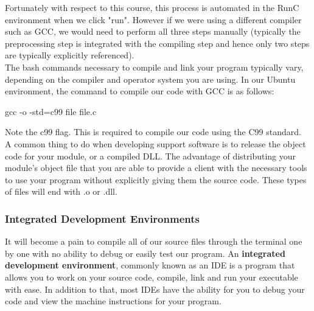 Fortunately with respect to this course, this process is automated in the RunC environment when we click "run". However if we were using a different compiler such as GCC, we would need to perform all three steps manually (typically the preprocessing step is integrated with the compiling step and hence only two steps are typically explicitly referenced).\\

The bash commands necessary to compile and link your program typically vary, depending on the compiler and operator system you are using. In our Ubuntu environment, the command to compile our code with GCC is as follows:\\

\begin{code}[bash]
gcc -o -std=c99 file file.c
\end{code}

Note the c99 flag. This is required to compile our code using the C99 standard.\\

A common thing to do when developing support software is to release the object code for your module, or a compiled DLL. The advantage of distributing your module's object file that you are able to provide a client with the necessary tools to use your program without explicitly giving them the source code. These types of files will end with .o or .dll.\\


\subsubsection*{Integrated Development Environments}

It will become a pain to compile all of our source files through the terminal one by one with no ability to debug or easily test our program. An \textbf{integrated development environment}, commonly known as an IDE is a program that allows you to work on your source code, compile, link and run your executable with ease. In addition to that, most IDEs have the ability for you to debug your code and view the machine instructions for your program.\\

